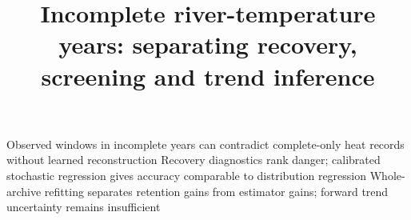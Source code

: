 \documentclass[draft,linenumbers]{agujournal2025}
\begin{document}
\title{Incomplete river-temperature years: separating recovery, screening and trend inference}
\keypoints
{Observed windows in incomplete years can contradict complete-only heat records without learned reconstruction}
{Recovery diagnostics rank danger; calibrated stochastic regression gives accuracy comparable to distribution regression}
{Whole-archive refitting separates retention gains from estimator gains; forward trend uncertainty remains insufficient}
\maketitle\par
\end{document}
